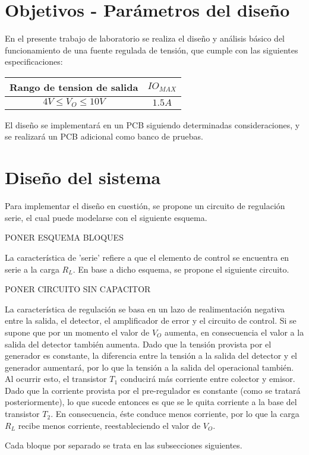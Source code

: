 



\tableofcontents
\newpage

\section{Objetivos - Par\'ametros del dise\~no}

En el presente trabajo de laboratorio se realiza el diseño y an\'alisis b\'asico del funcionamiento de una fuente regulada de tensi\'on, que cumple con las siguientes especificaciones:

\begin{center}
\begin{tabular}{|c|c|}
\hline 
Rango de tension de salida & $IO_{MAX}$\\
\hline 
\hline 
$4V \leq V_O \leq 10V$ & $1.5A$\\
\hline 
\end{tabular}
\end{center}

El diseño se implementar\'a en un PCB siguiendo determinadas consideraciones, y se realizar\'a un PCB adicional como banco de pruebas.

\section{Dise\~no del sistema}

Para implementar el dise\~no en cuesti\'on, se propone un circuito de regulaci\'on serie, el cual puede modelarse con el siguiente esquema.

PONER ESQUEMA BLOQUES

La caracter\'istica de 'serie' refiere a que el elemento de control se encuentra en serie a la carga $R_L$. En base a dicho esquema, se propone el siguiente circuito.

PONER CIRCUITO SIN CAPACITOR

La caracter\'istica de regulaci\'on se basa en un lazo de realimentaci\'on negativa entre la salida, el detector, el amplificador de error y el circuito de control. Si se supone que por un momento el valor de $V_O$ aumenta, en consecuencia el valor a la salida del detector tambi\'en aumenta. Dado que la tensi\'on provista por el generador es constante, la diferencia entre la tensi\'on a la salida del detector y el generador aumentar\'a, por lo que la tensi\'on a la salida del operacional tambi\'en. Al ocurrir esto, el transistor $T_1$ conducir\'a m\'as corriente entre colector y emisor. Dado que la corriente provista por el pre-regulador es constante (como se tratar\'a posteriormente), lo que sucede entonces es que se le quita corriente a la base del transistor $T_2$. En consecuencia, \'este conduce menos corriente, por lo que la carga $R_L$ recibe menos corriente, reestableciendo el valor de $V_O$.\par
Cada bloque por separado se trata en las subsecciones siguientes.

